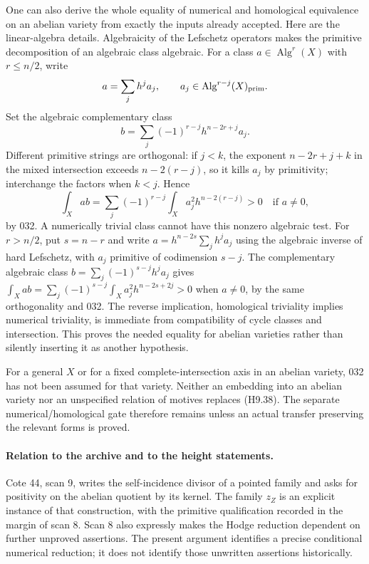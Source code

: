 \documentclass[11pt,a4paper]{article}
\begin{document}
One can also derive the whole equality of numerical and homological
equivalence on an abelian variety from exactly the inputs already
accepted. Here are the linear-algebra details. Algebraicity of the
Lefschetz operators makes the primitive decomposition of an algebraic
class algebraic. For a class $a\in\operatorname{Alg}^r(X)$ with
$r\le n/2$, write
\[
 a=\sum_j h^j a_j,
 \qquad a_j\in\operatorname{Alg}^{r-j}(X)_{\rm prim}.
\]
Set the algebraic complementary class
\[
 b=\sum_j(-1)^{r-j}h^{n-2r+j}a_j.
\]
Different primitive strings are orthogonal: if $j<k$, the exponent
$n-2r+j+k$ in the mixed intersection exceeds
$n-2(r-j)$, so it kills $a_j$ by primitivity; interchange the factors
when $k<j$. Hence
\[
 \int_X ab
   =\sum_j(-1)^{r-j}\int_Xa_j^2h^{n-2(r-j)}>0
       \quad\text{if }a\ne0,                               \tag{H9.38}
\]
by 032. A numerically trivial class cannot have this nonzero algebraic
test. For $r>n/2$, put $s=n-r$ and write
$a=h^{n-2s}\sum_j h^j a_j$ using the algebraic inverse of hard
Lefschetz, with $a_j$ primitive of codimension $s-j$. The complementary
algebraic class $b=\sum_j(-1)^{s-j}h^j a_j$ gives
$\int_Xab=\sum_j(-1)^{s-j}\int_Xa_j^2h^{n-2s+2j}>0$
when $a\ne0$, by the same orthogonality and 032. The reverse
implication, homological triviality implies numerical triviality,
is immediate from compatibility of cycle classes and intersection.
This proves the needed equality for abelian varieties rather than
silently inserting it as another hypothesis.

For a general $X$ or for a fixed complete-intersection axis in an
abelian variety, 032 has not been assumed for that variety. Neither
an embedding into an abelian variety nor an unspecified relation of
motives replaces (H9.38). The separate numerical/homological gate
therefore remains unless an actual transfer preserving the relevant
forms is proved.

\paragraph{Relation to the archive and to the height statements.}
Cote 44, scan 9, writes the self-incidence divisor of a pointed family
and asks for positivity on the abelian quotient by its kernel. The
family $z_Z$ is an explicit instance of that construction, with the
primitive qualification recorded in the margin of scan 8. Scan 8
also expressly makes the Hodge reduction dependent on further
unproved assertions. The present argument identifies a precise
conditional numerical reduction; it does not identify those
unwritten assertions historically.
\end{document}

